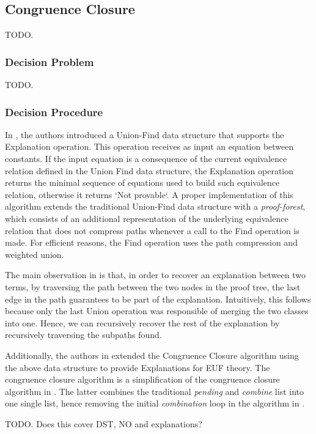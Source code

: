 \subsection{Congruence Closure}

TODO.

\subsubsection{Decision Problem}

TODO.

\subsubsection{Decision Procedure}

In \cite{10.1007/978-3-540-32033-3_33}, the authors 
introduced a Union-Find data structure that supports the 
Explanation operation. This operation receives as input 
an equation between constants. If the input equation is 
a consequence of the current equivalence relation defined 
in the Union Find data structure, the Explanation operation 
returns the minimal sequence of equations used to build 
such equivalence relation, otherwise it returns 
`Not provable`. A proper implementation of this algorithm 
extends the traditional Union-Find data structure with 
a \emph{proof-forest}, which consists of an additional 
representation of the underlying equivalence relation that 
does not compress paths whenever a call to the Find 
operation is made. For efficient reasons, the Find 
operation uses the path compression and weighted union.

The main observation in \cite{10.1007/978-3-540-32033-3_33} 
is that, in order to recover an explanation between 
two terms, by traversing the path between the two nodes 
in the proof tree, the last edge in the path guarantees to 
be part of the explanation. Intuitively, this follows because only 
the last Union operation was responsible of merging the 
two classes into one. Hence, we can recursively recover 
the rest of the explanation by recursively traversing 
the subpaths found.

Additionally, the authors in \cite{10.1007/978-3-540-32033-3_33} 
extended the Congruence Closure algorithm 
\cite{10.1007/978-3-540-39813-4_5} using the above data 
structure to provide Explanations for EUF theory. The congruence 
closure algorithm is a simplification of the congruence 
closure algorithm in \cite{10.1145/322217.322228}. The latter 
combines the traditional \emph{pending} and \emph{combine} list 
into one single list, hence removing the initial 
\emph{combination} loop in the algorithm in 
\cite{10.1145/322217.322228}.

TODO. Does this cover DST, NO and explanations?

